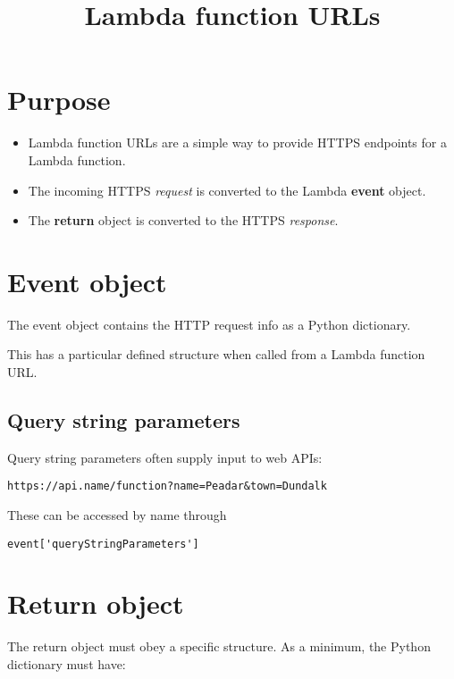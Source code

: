 \documentclass[slides]{pgnotes}
\title{Lambda function URLs}
\begin{document}
\maketitle

\section{Purpose}\label{purpose}

\begin{itemize}
\item Lambda function URLs are a simple way to provide HTTPS endpoints for a Lambda function.
\item The incoming HTTPS \textit{request} is converted to the Lambda \textbf{event} object.
\item The \textbf{return} object is converted to the HTTPS \textit{response}.
\end{itemize}

\section{Event object}\label{event-object}

The event object contains the HTTP request info as a Python dictionary.

This has a particular defined structure when called from a Lambda function URL.

\subsection{Query string parameters}\label{query-string-parameters}

Query string parameters often supply input to web APIs:

\begin{verbatim}
https://api.name/function?name=Peadar&town=Dundalk
\end{verbatim}

These can be accessed by name through
\begin{verbatim}
event['queryStringParameters']
\end{verbatim}
  
\section{Return object}\label{return-object}

The return object must obey a specific structure. As a minimum, the
Python dictionary must have:
\end{document}
